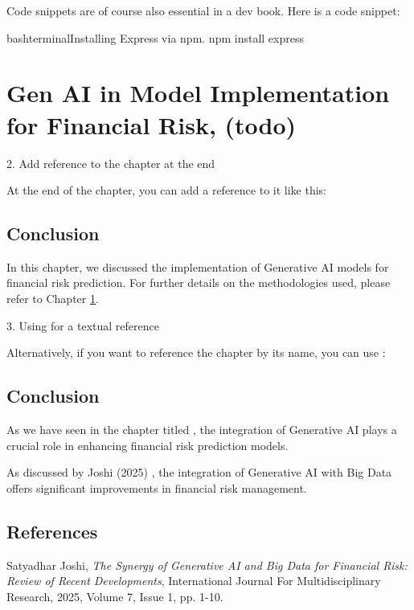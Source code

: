 \documentclass[a4paper,headinclude=on,footinclude=on,12pt,oneside]{scrbook}
\begin{document}
Code snippets are of course also essential in a dev book. Here is a code snippet:

\begin{codeInput}{bash}{terminal}{Installing Express via npm.}
	npm install express
\end{codeInput}




\chapter{Gen AI in Model Implementation for Financial Risk, (todo)} \label{chap:genai}

2. Add reference to the chapter at the end

At the end of the chapter, you can add a reference to it like this:

\section*{Conclusion}
In this chapter, we discussed the implementation of Generative AI models for financial risk prediction. For further details on the methodologies used, please refer to Chapter \ref{chap:genai}.

3. Using \nameref for a textual reference

Alternatively, if you want to reference the chapter by its name, you can use \nameref:

\section*{Conclusion}
As we have seen in the chapter titled , the integration of Generative AI plays a crucial role in enhancing financial risk prediction models.





As discussed by Joshi (2025) \cite{Joshi2025}, the integration of Generative AI with Big Data offers significant improvements in financial risk management.

\section*{References}
\begin{thebibliography}{9}
	Satyadhar Joshi,
	\textit{The Synergy of Generative AI and Big Data for Financial Risk: Review of Recent Developments},
	International Journal For Multidisciplinary Research, 2025, Volume 7, Issue 1, pp. 1-10.
\end{thebibliography}
\end{document}
